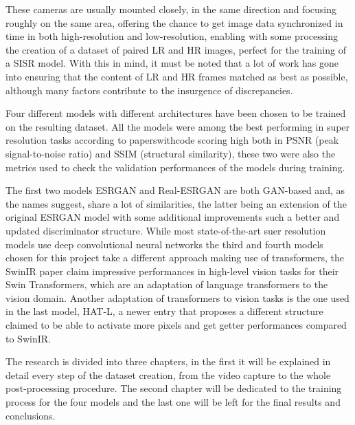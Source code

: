 These cameras are usually mounted closely, in the same direction and focusing roughly on the same area, offering the chance to get image data synchronized in time in both high-resolution and low-resolution, enabling with some processing the creation of a dataset of paired LR and HR images, perfect for the training of a SISR model. With this in mind, it must be noted that a lot of work has gone into ensuring that the content of LR and HR frames matched as best as possible, although many factors contribute to the insurgence of discrepancies.

Four different models with different architectures have been chosen to be trained on the resulting dataset. All the models were among the best performing in super resolution tasks according to paperswithcode \cite{pwcode} scoring high both in PSNR\cite{psnr} (peak signal-to-noise ratio) and SSIM\cite{ssim} (structural similarity), these two were also the metrics used to check the validation performances of the models during training.

The first two models ESRGAN\cite{wang2018esrgan} and Real-ESRGAN\cite{wang2021realesrgan} are both GAN-based and, as the names suggest, share a lot of similarities, the latter being an extension of the original ESRGAN model with some additional improvements such a better and updated discriminator structure. While most state-of-the-art suer resolution models use deep convolutional neural networks the third and fourth models chosen for this project take a different approach making use of transformers, the SwinIR\cite{liang2021swinir} paper claim impressive performances in high-level vision tasks for their Swin Transformers\cite{liu2021swin}, which are an adaptation of language transformers to the vision domain. Another adaptation of transformers to vision tasks is the one used in the last model, HAT-L\cite{chen2023activating}, a newer entry that proposes a different structure claimed to be able to activate more pixels and get getter performances compared to SwinIR.

The research is divided into three chapters, in the first it will be explained in detail every step of the dataset creation, from the video capture to the whole post-processing procedure. The second chapter will be dedicated to the training process for the four models and the last one will be left for the final results and conclusions.
